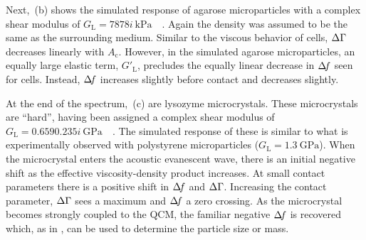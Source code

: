 Next, \,(b) shows the simulated response of agarose
microparticles with a complex shear modulus of
$G_\mathrm{L}=\SI{78+78i}{\kilo\pascal}$~\cite{yao1999situ}~\cite{dimitriadis2002determination}.
Again the density was assumed to be the same as the surrounding medium.
Similar to the viscous behavior of cells, $\Delta\Gamma$ decreases linearly with
$A_\mathrm{c}$.  However, in the simulated agarose microparticles, an
equally large elastic term, $G'_\mathrm{L}$, precludes the equally linear
decrease in $\Delta\!f$ seen for cells.  Instead, $\Delta\!f$ increases slightly before
contact and decreases slightly.

At the end of the spectrum, \,(c) are lysozyme
microcrystals.  These microcrystals are ``hard'', having been assigned a
complex shear modulus of
$G_\mathrm{L}=\SI{0.659+0.235i}{\giga\pascal}$~\cite{zamiri2009modeling}~\cite{guo2008investigation}.
The simulated response of these is similar to what is experimentally
observed with polystyrene microparticles
($G_\mathrm{L}=\SI{1.3}{\giga\pascal}$).  When the microcrystal enters the
acoustic evanescent wave, there is an initial negative shift as the
effective viscosity-density product increases.  At small contact parameters
there is a positive shift in $\Delta\!f$ and $\Delta\Gamma$.  Increasing the contact
parameter, $\Delta\Gamma$ sees a maximum and $\Delta\!f$ a zero crossing.  As the
microcrystal becomes strongly coupled to the QCM, the familiar negative
$\Delta\!f$ is recovered which, as in , can be used to
determine the particle size or mass.
